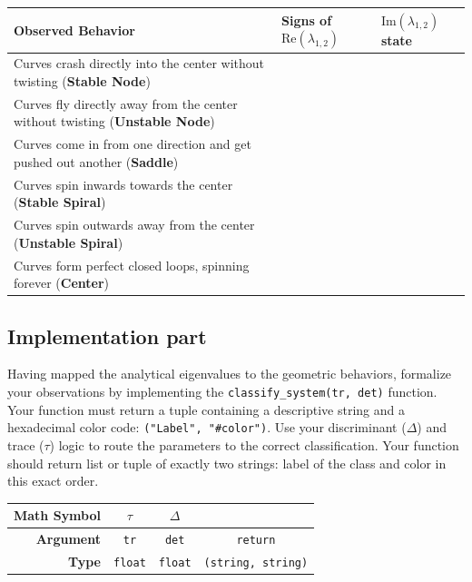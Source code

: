 \documentclass[11pt]{article}
\begin{document}
\begin{center}
\renewcommand{\arraystretch}{2.0}
\begin{tabular}{p{7.5cm} | p{4cm} | p{3.5cm}}
\toprule
\textbf{Observed Behavior} & \textbf{Signs of $\text{Re}(\lambda_{1,2})$} & \textbf{$\text{Im}(\lambda_{1,2})$ state} \\
\midrule
Curves crash directly into the center without twisting (\textbf{Stable Node}) & & \\ \midrule
Curves fly directly away from the center without twisting (\textbf{Unstable Node}) & & \\ \midrule
Curves come in from one direction and get pushed out another (\textbf{Saddle}) & & \\ \midrule
Curves spin inwards towards the center (\textbf{Stable Spiral}) & & \\ \midrule
Curves spin outwards away from the center (\textbf{Unstable Spiral}) & & \\ \midrule
Curves form perfect closed loops, spinning forever (\textbf{Center}) & & \\
\bottomrule
\end{tabular}
\end{center}




\subsection*{Implementation part}

Having mapped the analytical eigenvalues to the geometric behaviors, formalize your observations by implementing the \lstinline|classify_system(tr, det)| function. Your function must return a tuple containing a descriptive string and a hexadecimal color code: \lstinline|("Label", "#color")|. Use your discriminant ($\Delta$) and trace ($\tau$) logic to route the parameters to the correct classification. Your function should return list or tuple of exactly two strings: label of the class and color in this exact order.
\begin{center}
\renewcommand{\arraystretch}{2.0}
\begin{tabular}{r | c | c | c}
\toprule
\textbf{Math Symbol} & $\tau$ & $\Delta$ &  \\ \midrule
\textbf{Argument} & \lstinline|tr| & \lstinline|det| & \lstinline|return| \\ \midrule
\textbf{Type} & \lstinline|float| & \lstinline|float| & \lstinline|(string, string)|\\
\bottomrule
\end{tabular}
\end{center}
\end{document}
